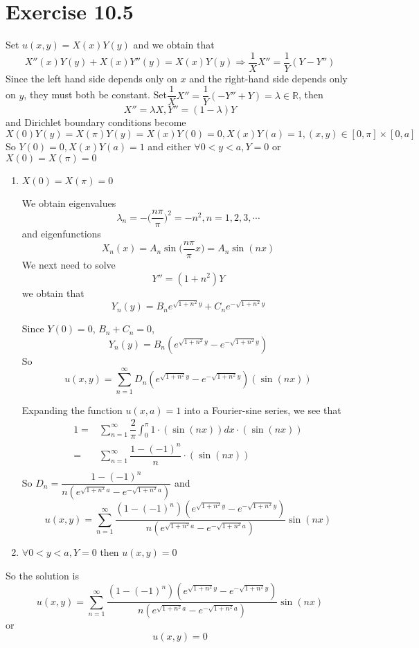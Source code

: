 \documentclass[a4paper,12pt,titlepage]{article}
\begin{document}
\section*{Exercise 10.5}
Set $u(x,y)=X(x)Y(y)$ and we obtain that
$$X''(x)Y(y)+X(x)Y''(y)=X(x)Y(y)\Rightarrow \dfrac{1}{X}X''=\dfrac{1}{Y}(Y-Y'')$$
Since the left hand side depends only on $x$ and the right-hand side depends only on $y$, they must both be constant. Set$\dfrac{1}{X}X''=\dfrac{1}{Y}(-Y''+Y)=\lambda\in\mathbb{R}$, then
$$X''=\lambda X, Y''=(1-\lambda)Y$$
and Dirichlet boundary conditions become
$$X(0)Y(y)=X(\pi)Y(y)=X(x)Y(0)=0,X(x)Y(a)=1,(x,y)\in[0,\pi]\times[0,a]$$
So $Y(0)=0,X(x)Y(a)=1$ and either $\forall 0<y<a, Y=0$ or $X(0)=X(\pi)=0$
\begin{enumerate}
\item $X(0)=X(\pi)=0$

We obtain eigenvalues 
$$\lambda_n=-\Big(\dfrac{n\pi}{\pi}\Big)^2=-n^2,n=1,2,3,\cdots$$
and eigenfunctions
$$X_n(x)=A_n\sin\Big(\dfrac{n\pi}{\pi}x\Big)=A_n\sin(nx)$$
We next need to solve
$$Y''=(1+n^2)Y$$
we obtain that
$$Y_n(y)=B_ne^{\sqrt{1+n^2}y}+C_ne^{-\sqrt{1+n^2}y}$$

Since $Y(0)=0$, $B_n+C_n=0$,
$$Y_n(y)=B_n(e^{\sqrt{1+n^2}y}-e^{-\sqrt{1+n^2}y})$$
So
$$u(x,y)=\sum\limits_{n=1}^{\infty}D_n(e^{\sqrt{1+n^2}y}-e^{-\sqrt{1+n^2}y})(\sin(nx))$$

Expanding the function $u(x, a) = 1$ into a Fourier-sine series, we see that
\begin{align*}
1=&\sum\limits_{n=1}^{\infty}\dfrac{2}{\pi}\int_{0}^{\pi}1\cdot(\sin(nx))dx\cdot (\sin(n x))\\
=&\sum\limits_{n=1}^{\infty}\dfrac{1-(-1)^n}{n}\cdot (\sin(nx))\\
\end{align*}
So $D_n=\dfrac{1-(-1)^n}{n(e^{\sqrt{1+n^2}a}-e^{-\sqrt{1+n^2}a})}$ and
$$u(x,y)=\sum\limits_{n=1}^{\infty}\dfrac{(1-(-1)^n)(e^{\sqrt{1+n^2}y}-e^{-\sqrt{1+n^2}y})}{n(e^{\sqrt{1+n^2}a}-e^{-\sqrt{1+n^2}a})}\sin(nx)$$
\item
$\forall 0<y<a, Y=0$ then $u(x,y)=0$

\end{enumerate}

So the solution is
$$u(x,y)=\sum\limits_{n=1}^{\infty}\dfrac{(1-(-1)^n)(e^{\sqrt{1+n^2}y}-e^{-\sqrt{1+n^2}y})}{n(e^{\sqrt{1+n^2}a}-e^{-\sqrt{1+n^2}a})}\sin(nx)$$
or
$$u(x,y)=0$$
\end{document}
